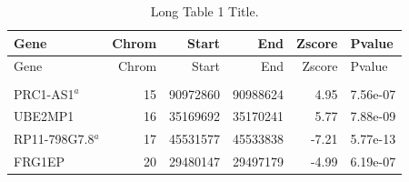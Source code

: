 \begin{longtable}[c]{lrrrrl}
\caption[Table 1 Title for Table of Contents.]{Long Table 1 Title.} \label{tab:table1}\\
 \toprule
 Gene & Chrom & Start & End & Zscore & Pvalue \\
 \midrule
\endfirsthead
 \midrule
 Gene & Chrom & Start & End & Zscore & Pvalue \\
 \midrule
\endhead
 \midrule
\endfoot
 \bottomrule
 \multicolumn{6}{l}{\footnotesize $a$ footnote} \\
\endlastfoot
 PRC1-AS1$^{a}$ & 15 & 90972860 & 90988624 & 4.95 & 7.56e-07 \\
 UBE2MP1 & 16 & 35169692 & 35170241 & 5.77 & 7.88e-09 \\
 RP11-798G7.8$^{a}$ & 17 & 45531577 & 45533838 & -7.21 & 5.77e-13 \\
 FRG1EP & 20 & 29480147 & 29497179 & -4.99 & 6.19e-07 \\
\end{longtable}

